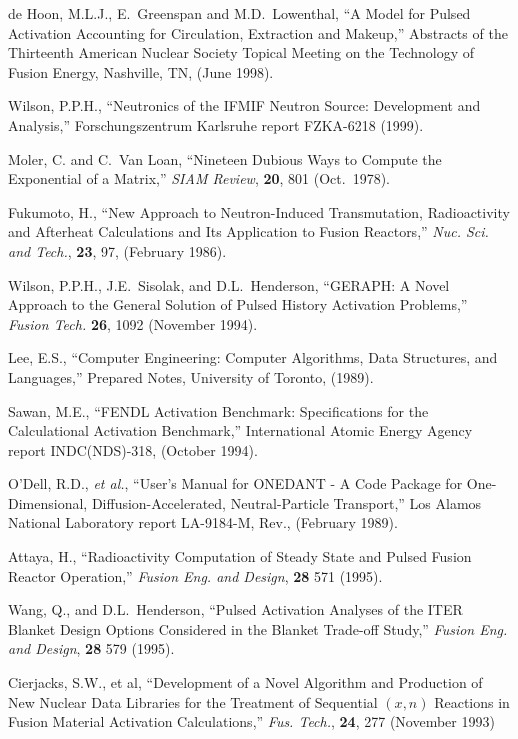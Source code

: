 \begin{thebibliography}{100}
 de Hoon, M.L.J., E.~Greenspan and
  M.D.~Lowenthal, ``A Model for Pulsed Activation Accounting for
  Circulation, Extraction and Makeup,'' Abstracts of the Thirteenth
  American Nuclear Society Topical Meeting on the Technology of Fusion
  Energy, Nashville, TN, (June 1998).
  
 Wilson, P.P.H., ``Neutronics of the IFMIF Neutron
  Source: Development and Analysis,'' Forschungszentrum Karlsruhe
  report FZKA-6218 (1999).
  
 Moler, C. and C.~Van Loan, ``Nineteen Dubious Ways to
  Compute the Exponential of a Matrix,'' \textsl{SIAM
    Review}, \textbf{20}, 801 (Oct.~1978).
  
 Fukumoto, H., ``New Approach to
  Neutron-Induced Transmutation, Radioactivity and Afterheat
  Calculations and Its Application to Fusion Reactors,'' \textsl{Nuc. Sci.
  and Tech.}, \textbf{23}, 97, (February 1986).
  
 Wilson, P.P.H., J.E.~Sisolak, and D.L.~Henderson,
  ``GERAPH: A Novel Approach to the General Solution of Pulsed History
  Activation Problems,'' \textsl{Fusion Tech.} \textbf{26}, 1092
  (November 1994).
  
 Lee, E.S., ``Computer Engineering: Computer
  Algorithms, Data Structures, and Languages,'' Prepared Notes,
  University of Toronto, (1989).
  
 Sawan, M.E., ``FENDL Activation Benchmark:
  Specifications for the Calculational Activation Benchmark,''
  International Atomic Energy Agency report INDC(NDS)-318, (October
  1994).
  
 O'Dell, R.D., \textsl{et al.}, ``User's Manual for
  ONEDANT - A Code Package for One-Dimensional, Diffusion-Accelerated,
  Neutral-Particle Transport,'' Los Alamos National Laboratory report
  LA-9184-M, Rev., (February 1989).
  
 Attaya, H., ``Radioactivity Computation of Steady
  State and Pulsed Fusion Reactor Operation,'' \textsl{Fusion Eng. and
  Design}, \textbf{28} 571 (1995).

 Wang, Q., and D.L.~Henderson, ``Pulsed Activation
  Analyses of the ITER Blanket Design Options Considered in the
  Blanket Trade-off Study,'' \textsl{Fusion Eng. and Design},
  \textbf{28} 579 (1995).
  
 Cierjacks, S.W., et al, ``Development of a Novel
  Algorithm and Production of New Nuclear Data Libraries for the
  Treatment of Sequential $(x,n)$ Reactions in Fusion Material
  Activation Calculations,'' \textsl{Fus. Tech.}, \textbf{24}, 277
  (November 1993)
    

\end{thebibliography}
